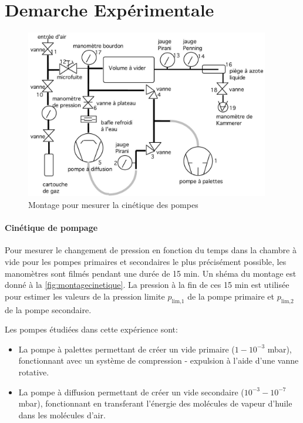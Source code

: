 \section{Demarche Expérimentale}

\begin{figure}[h]
    \centering
    \includegraphics[width=0.95\textwidth]{figures/montage_cinetique.png}
    \caption{Montage pour mesurer la cinétique des pompes}
    \label{fig:montagecinetique}
\end{figure}

\paragraph*{Cinétique de pompage}
Pour mesurer le changement de pression en fonction du temps dans la chambre à vide pour les pompes primaires et secondaires le plus précisément possible, les manomètres sont filmés pendant une durée de 15 \unit{\minute}. Un shéma du montage est donné à la \autoref{fig:montagecinetique}. La pression à la fin de ces 15 \unit{\minute} est utilisée pour estimer les valeurs de la pression limite \(p_\textrm{lim,1}\) de la pompe primaire et \(p_\textrm{lim,2}\) de la pompe secondaire.

Les pompes étudiées dans cette expérience sont:

\begin{itemize}
    \item La pompe à palettes permettant de créer un vide primaire (\(1 - 10^{-3}\) \unit{\milli\bar}), fonctionnant avec un système de compression - expulsion à l'aide d'une vanne rotative.
    \item La pompe à diffusion permettant de créer un vide secondaire (\(10^{-3} - 10^{-7}\) \unit{\milli\bar}), fonctionnant en transferant l'énergie des molécules de vapeur d'huile dans les molécules d'air.
\end{itemize}

